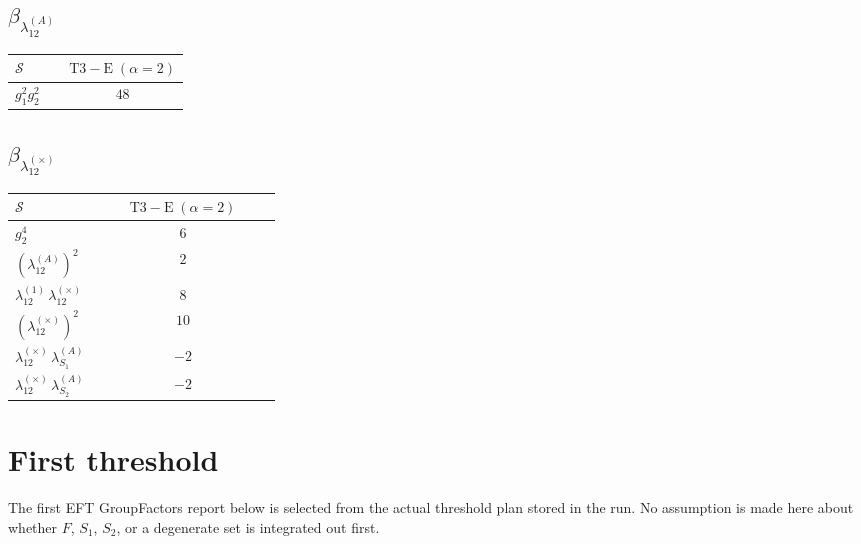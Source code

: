 \documentclass[9pt]{article}
\begin{document}
\subsection*{$ \beta_{\lambda_{12}^{(A)}} $}
\begin{longtable}{@{}p{0.31\linewidth}c@{}}
\toprule
$\mathcal{S}$ & $ \mathrm{T3-E}\;(\alpha=2) $ \\
\midrule
$ g_1^2g_2^2 $ & $ 48 $ \\
\bottomrule
\end{longtable}
\subsection*{$ \beta_{\lambda_{12}^{(\times)}} $}
\begin{longtable}{@{}p{0.31\linewidth}c@{}}
\toprule
$\mathcal{S}$ & $ \mathrm{T3-E}\;(\alpha=2) $ \\
\midrule
$ g_2^4 $ & $ 6 $ \\
$ \left(\lambda_{12}^{(A)}\right)^2 $ & $ 2 $ \\
$ \lambda_{12}^{(1)}\,\lambda_{12}^{(\times)} $ & $ 8 $ \\
$ \left(\lambda_{12}^{(\times)}\right)^2 $ & $ 10 $ \\
$ \lambda_{12}^{(\times)}\,\lambda_{S_1}^{(A)} $ & $ -2 $ \\
$ \lambda_{12}^{(\times)}\,\lambda_{S_2}^{(A)} $ & $ -2 $ \\
\bottomrule
\end{longtable}
\section*{First threshold}
The first EFT GroupFactors report below is selected from the actual threshold plan stored in the run.  No assumption is made here about whether $F$, $S_1$, $S_2$, or a degenerate set is integrated out first.
\end{document}
